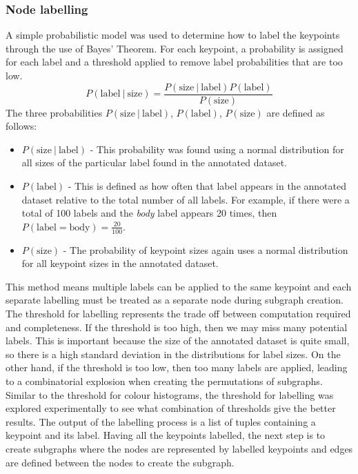 \subsubsection{Node labelling}\label{sec:probabilistic-model}
A simple probabilistic model was used to determine how to label the keypoints through the use of Bayes' Theorem. For each keypoint, a probability is assigned for each label and a threshold applied to remove label probabilities that are too low.
\begin{equation}\label{eq:bayes-labelling}
P(\text{label}\ |\ \text{size}) = \frac{P(\text{size}\ |\ \text{label}) P(\text{label})} {P(\text{size})}
\end{equation}
The three probabilities $P(\text{size}\ |\ \text{label})$, $P(\text{label})$, $P(\text{size})$ are defined as follows:
\begin{itemize}
\item $P(\text{size}\ |\ \text{label})$ - This probability was found using a normal distribution for all sizes of the particular label found in the annotated dataset.
\item $P(\text{label})$ - This is defined as how often that label appears in the annotated dataset relative to the total number of all labels. For example, if there were a total of 100 labels and the \textit{body} label appears 20 times, then $P(\text{label} = \text{body}) = \frac{20}{100}$.
\item $P(\text{size})$ - The probability of keypoint sizes again uses a normal distribution for all keypoint sizes in the annotated dataset.
\end{itemize}
This method means multiple labels can be applied to the same keypoint and each separate labelling must be treated as a separate node during subgraph creation. The threshold for labelling represents the trade off between computation required and completeness. If the threshold is too high, then we may miss many potential labels. This is important because the size of the annotated dataset is quite small, so there is a high standard deviation in the distributions for label sizes. On the other hand, if the threshold is too low, then too many labels are applied, leading to a combinatorial explosion when creating the permutations of subgraphs. Similar to the threshold for colour histograms, the threshold for labelling was explored experimentally to see what combination of thresholds give the better results. The output of the labelling process is a list of tuples containing a keypoint and its label. Having all the keypoints labelled, the next step is to create subgraphs where the nodes are represented by labelled keypoints and edges are defined between the nodes to create the subgraph. 

